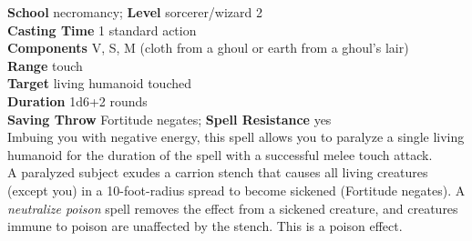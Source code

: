 \textbf{School} necromancy; \textbf{Level} sorcerer/wizard 2\\
\textbf{Casting Time} 1 standard action\\
\textbf{Components} V, S, M (cloth from a ghoul or earth from a ghoul's lair)\\
\textbf{Range} touch\\
\textbf{Target} living humanoid touched\\
\textbf{Duration} 1d6+2 rounds\\
\textbf{Saving Throw} Fortitude negates; \textbf{Spell Resistance} yes\\
Imbuing you with negative energy, this spell allows you to paralyze a single living humanoid for the duration of the spell with a successful melee touch attack.\\
A paralyzed subject exudes a carrion stench that causes all living creatures (except you) in a 10-foot-radius spread to become sickened (Fortitude negates). A \textit{neutralize poison }spell removes the effect from a sickened creature, and creatures immune to poison are unaffected by the stench. This is a poison effect.\\
